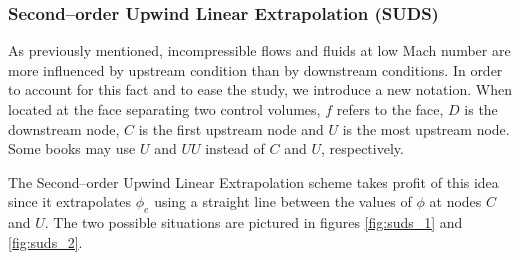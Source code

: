 \subsubsection{Second--order Upwind Linear Extrapolation (SUDS)}

As previously mentioned, incompressible flows and fluids at low Mach number are
more influenced by upstream condition than by downstream conditions. In order to
account for this fact and to ease the study, we introduce a new notation. When
located at the face separating two control volumes, $f$ refers to the face, $D$
is the downstream node, $C$ is the first upstream node and $U$ is the most
upstream node. Some books may use $U$ and $UU$ instead of $C$ and $U$,
respectively.

The Second--order Upwind Linear Extrapolation scheme takes profit of this idea
since it extrapolates $\phi_e$ using a straight line between the values of
$\phi$ at nodes $C$ and $U$. The two possible situations are pictured in figures
\ref{fig:suds_1} and \ref{fig:suds_2}.
\FloatBarrier

